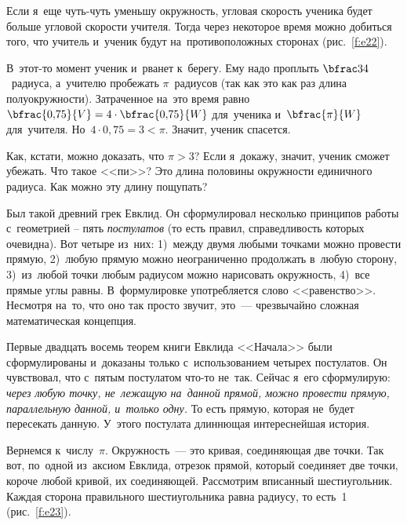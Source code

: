 
Если я~еще чуть-чуть уменьшу окружность, угловая скорость ученика будет больше угловой скорости учителя.
Тогда через некоторое время можно добиться того, что учитель и~ученик будут на~противоположных
сторонах (рис.~\ref{f:e22}).


\pagebreak

В~этот-то момент ученик и~рванет к~берегу. Ему надо проплыть $\bfrac34$~радиуса, а~учителю пробежать $\pi$~радиусов (так как это как раз длина полуокружности).
Затраченное на~это время равно $\bfrac{0{,}75}{V}=4\cdot\bfrac{0{,}75}{W}$ для~ученика и~$\bfrac{\pi}{W}$ для~учителя. Но~$4\cdot0{,}75 =3<\pi$.
Значит, ученик спасется.

Как, кстати, можно доказать, что $\pi>3$? Если я~докажу, значит, ученик сможет убежать. Что такое
<<пи>>? Это длина половины окружности единичного радиуса. Как можно эту длину пощупать?

Был такой древний грек Евклид. Он сформулировал несколько принципов работы с~геометрией -- пять
\textit{постулатов} (то есть правил, справедливость которых очевидна). Вот четыре из~них: 1)~между двумя любыми
точками можно провести прямую, 2)~любую прямую можно неограниченно продолжать в~любую сторону,
3)~из~любой точки любым радиусом можно нарисовать окружность, 4)~все прямые углы равны. В~формулировке
употребляется слово <<равенство>>. Несмотря на~то, что оно так просто звучит, это~--- чрезвычайно
сложная математическая концепция.

Первые двадцать восемь теорем книги Евклида <<Начала>> были сформулированы и~доказаны только
с~использованием четырех постулатов. Он чувствовал, что с~пятым постулатом что-то не~так. Сейчас
я~его сформулирую: \textit{через любую точку, не~лежащую на~данной прямой, можно провести прямую,
параллельную данной, и~только одну.} То есть прямую, которая не~будет пересекать данную. У~этого
постулата длиннющая интереснейшая история.

Вернемся к~числу~$\pi$. Окружность~--- это кривая, соединяющая две точки. Так вот, по~одной из~аксиом
Евклида, отрезок прямой, который соединяет две точки, короче любой кривой, их соединяющей.
Рассмотрим вписанный шестиугольник. Каждая сторона правильного шестиугольника равна радиусу, то
есть~1 (рис.~\ref{f:e23}).


